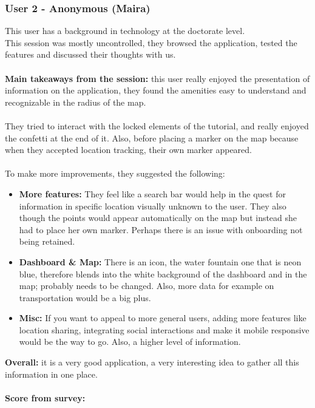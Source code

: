 \subsubsection{User 2 - Anonymous (Maira)}
This user has a background in technology at the doctorate level.\\
This session was mostly uncontrolled, they browsed the application, tested the features and discussed their thoughts with us.\\\\
\textbf{Main takeaways from the session: } this user really enjoyed the presentation of information on the application, they found the amenities easy to understand and recognizable in the radius of the map.\\\\
They tried to interact with the locked elements of the tutorial, and really enjoyed the confetti at the end of it. Also, before placing a marker on the map because when they accepted location tracking, their own marker appeared.\\\\
To make more improvements, they suggested the following:
\begin{itemize}
    \item \textbf{More features: }They feel like a search bar would help in the quest for information in specific location visually unknown to the user. They also though the points would appear automatically on the map but instead she had to place her own marker. Perhaps there is an issue with onboarding not being retained.
    \item \textbf{Dashboard \& Map: }There is an icon, the water fountain one that is neon blue, therefore blends into the white background of the dashboard and in the map; probably needs to be changed. Also, more data for example on transportation would be a big plus.
    \item \textbf{Misc: } If you want to appeal to more general users, adding more features like location sharing, integrating social interactions and make it mobile responsive would be the way to go. Also, a higher level of information.
\end{itemize}
\textbf{Overall: }it is a very good application, a very interesting idea to gather all this information in one place.\\\\
\textbf{Score from survey: }
